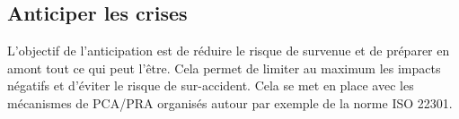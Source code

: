 \subsection{Anticiper les crises}

L’objectif de l’anticipation est de réduire le risque de survenue et de préparer en amont tout ce qui peut l’être. Cela permet de limiter au maximum les impacts négatifs et d’éviter le risque de sur-accident. Cela se met en place avec les mécanismes de PCA/PRA organisés autour par exemple de la norme ISO 22301.

%
%
